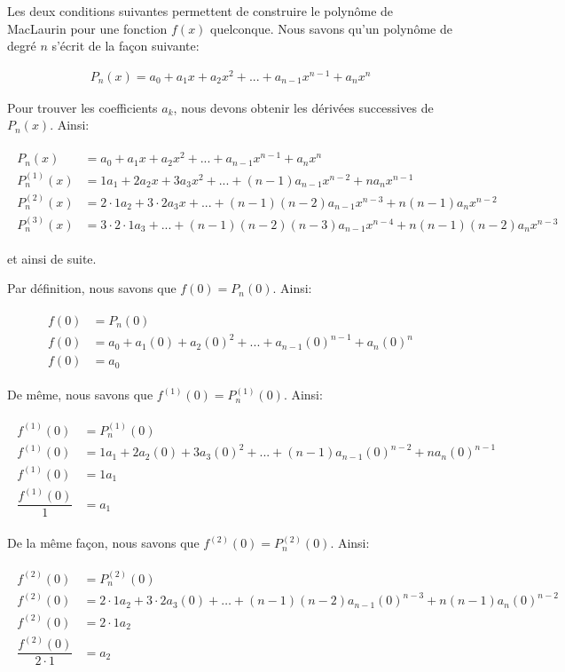 \documentclass[]{book}
\theoremstyle{definition}
\theoremstyle{definition}
\theoremstyle{definition}
\theoremstyle{remark}
\begin{document}
Les deux conditions suivantes permettent de construire le polynôme de
MacLaurin pour une fonction \(f(x)\) quelconque. Nous savons qu'un
polynôme de degré \(n\) s'écrit de la façon suivante:

\begin{align*}
P_n(x)=a_0+a_1x+a_2x^2+...+a_{n-1}x^{n-1}+a_nx^n
\end{align*}

Pour trouver les coefficients \(a_k\), nous devons obtenir les dérivées
successives de \(P_n(x)\). Ainsi:

\begin{align}
\begin{split}
P_n(x) &= a_0+a_1x+a_2x^2+...+a_{n-1}x^{n-1}+a_nx^n \\
P_n^{(1)}(x) &= 1a_1+2a_2x+3a_3x^2+...+(n-1)a_{n-1}x^{n-2}+na_nx^{n-1} \\
P_n^{(2)}(x) &= 2\cdot 1a_2+3\cdot 2a_3x+...+(n-1)(n-2)a_{n-1}x^{n-3}+n(n-1)a_nx^{n-2} \\
P_n^{(3)}(x) &= 3\cdot 2\cdot 1a_3+...+(n-1)(n-2)(n-3)a_{n-1}x^{n-4}+n(n-1)(n-2)a_nx^{n-3}
\end{split}
\end{align}

et ainsi de suite.

Par définition, nous savons que \(f(0)=P_n(0)\). Ainsi:

\begin{align}
\begin{split}
f(0)&=P_n(0) \\
f(0) &= a_0+a_1(0)+a_2(0)^2+...+a_{n-1}(0)^{n-1}+a_n(0)^n \\
f(0)&=a_0
\end{split}
\end{align}

De même, nous savons que \(f^{(1)}(0)=P_n^{(1)}(0)\). Ainsi:

\begin{align}
\begin{split}
f^{(1)}(0)&=P_n^{(1)}(0)\\
f^{(1)}(0)&=1a_1+2a_2(0)+3a_3(0)^2+...+(n-1)a_{n-1}(0)^{n-2}+na_n(0)^{n-1} \\
f^{(1)}(0)&=1a_1  \\
\dfrac{f^{(1)}(0)}{1}&=a_1
\end{split}
\end{align}

De la même façon, nous savons que \(f^{(2)}(0)=P_n^{(2)}(0)\). Ainsi:

\begin{align}
\begin{split}
f^{(2)}(0)&=P^{(2)}_n(0)\\
f^{(2)}(0)&=2\cdot 1a_2+3\cdot 2a_3(0)+\ldots+(n-1)(n-2)a_{n-1}(0)^{n-3}+n(n-1)a_n(0)^{n-2} \\
f^{(2)}(0)&=2\cdot 1a_2  \\
\dfrac{f^{(2)}(0)}{2\cdot 1}&=a_2
\end{split}
\end{align}
\end{document}
